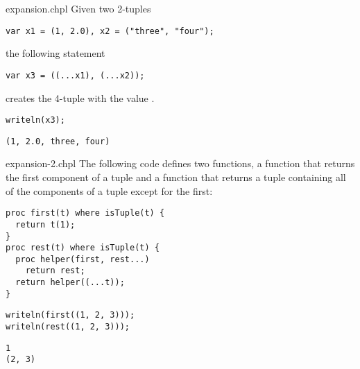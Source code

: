 \begin{chapelexample}{expansion.chpl}
Given two 2-tuples
\begin{chapel}
\begin{verbatim}
var x1 = (1, 2.0), x2 = ("three", "four");
\end{verbatim}
\end{chapel}
the following statement
\begin{chapel}
\begin{verbatim}
var x3 = ((...x1), (...x2));
\end{verbatim}
\end{chapel}
creates the 4-tuple  with the value
.
\begin{chapelpost}
\begin{verbatim}
writeln(x3);
\end{verbatim}
\end{chapelpost}
\begin{chapeloutput}
\begin{verbatim}
(1, 2.0, three, four)
\end{verbatim}
\end{chapeloutput}
\end{chapelexample}

\begin{chapelexample}{expansion-2.chpl}
The following code defines two functions, a function  that
returns the first component of a tuple and a function  that
returns a tuple containing all of the components of a tuple except for
the first:
\begin{chapel}
\begin{verbatim}
proc first(t) where isTuple(t) {
  return t(1);
}
proc rest(t) where isTuple(t) {
  proc helper(first, rest...)
    return rest;
  return helper((...t));
}
\end{verbatim}
\end{chapel}
\begin{chapelpost}
\begin{verbatim}
writeln(first((1, 2, 3)));
writeln(rest((1, 2, 3)));
\end{verbatim}
\end{chapelpost}
\begin{chapeloutput}
\begin{verbatim}
1
(2, 3)
\end{verbatim}
\end{chapeloutput}
\end{chapelexample}


